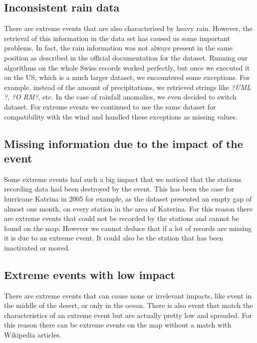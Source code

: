 \documentclass[12pt]{article}
\begin{document}
\subsection{Inconsistent rain data}
There are extreme events that are also characterised by heavy rain. However, the retrieval of this information in the data set has caused us some important problems. In fact, the rain information was not always present in the same position as described in the official documentation for the dataset. Running our algorithms on the whole Swiss records worked perfectly, but once we executed it on the US, which is a much larger dataset, we encountered some exceptions. For example, instead of the amount of precipitations, we retrieved strings like \textit{?UML ?}, \textit{?O RM?}, etc. In the case of rainfall anomalies,  we even decided to switch dataset. For extreme events we continued to use the same dataset for compatibility with the wind and handled these exceptions as missing values.

\subsection{Missing information due to the impact of the event}
Some extreme events had such a big impact that we noticed that the stations recording data had been destroyed by the event. This has been the case for hurricane Katrina in 2005 for example, as the dataset presented an empty gap of almost  one month, on every station in the area of Katerina. For this reason there are extreme events that could not be recorded by the stations and cannot be found on the map. However we cannot deduce that if a lot of records are missing it is due to an extreme event. It could also be the station that has been inactivated or moved.

\subsection{Extreme events with low impact}
There are extreme events that can cause none or irrelevant impacts, like event in the middle of the desert, or only in the ocean. There is also event that match the characteristics of an extreme event but are actually pretty low and spreaded. For this reason there can be extreme events on the map without a match with Wikipedia articles.
\end{document}
